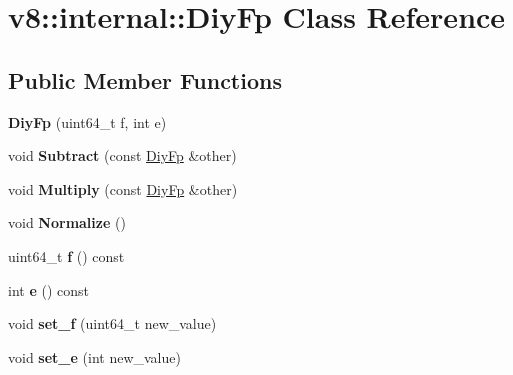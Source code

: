 \hypertarget{classv8_1_1internal_1_1_diy_fp}{}\section{v8\+:\+:internal\+:\+:Diy\+Fp Class Reference}
\label{classv8_1_1internal_1_1_diy_fp}
\subsection*{Public Member Functions}
\begin{DoxyCompactItemize}
\item 
\hypertarget{classv8_1_1internal_1_1_diy_fp_a706c119a6d9aa35dcf0781f2e2a283a0}{}{\bfseries Diy\+Fp} (uint64\+\_\+t f, int e)\label{classv8_1_1internal_1_1_diy_fp_a706c119a6d9aa35dcf0781f2e2a283a0}

\item 
\hypertarget{classv8_1_1internal_1_1_diy_fp_ad59641acca06e61296ab5b9436bcbe85}{}void {\bfseries Subtract} (const \hyperlink{classv8_1_1internal_1_1_diy_fp}{Diy\+Fp} \&other)\label{classv8_1_1internal_1_1_diy_fp_ad59641acca06e61296ab5b9436bcbe85}

\item 
\hypertarget{classv8_1_1internal_1_1_diy_fp_a50c7369cc4e9d7e9c3add0f7a4818645}{}void {\bfseries Multiply} (const \hyperlink{classv8_1_1internal_1_1_diy_fp}{Diy\+Fp} \&other)\label{classv8_1_1internal_1_1_diy_fp_a50c7369cc4e9d7e9c3add0f7a4818645}

\item 
\hypertarget{classv8_1_1internal_1_1_diy_fp_a39ba5a89a07fe9feaa4de5695da55310}{}void {\bfseries Normalize} ()\label{classv8_1_1internal_1_1_diy_fp_a39ba5a89a07fe9feaa4de5695da55310}

\item 
\hypertarget{classv8_1_1internal_1_1_diy_fp_aa67842c9f9223032303d8088436027bd}{}uint64\+\_\+t {\bfseries f} () const \label{classv8_1_1internal_1_1_diy_fp_aa67842c9f9223032303d8088436027bd}

\item 
\hypertarget{classv8_1_1internal_1_1_diy_fp_a8812342f7d608411992e55fd6f51c84e}{}int {\bfseries e} () const \label{classv8_1_1internal_1_1_diy_fp_a8812342f7d608411992e55fd6f51c84e}

\item 
\hypertarget{classv8_1_1internal_1_1_diy_fp_a95098aea05a2339189be1547512423e1}{}void {\bfseries set\+\_\+f} (uint64\+\_\+t new\+\_\+value)\label{classv8_1_1internal_1_1_diy_fp_a95098aea05a2339189be1547512423e1}

\item 
\hypertarget{classv8_1_1internal_1_1_diy_fp_a64c435e55ebd3bfd48b1a5b00d9be055}{}void {\bfseries set\+\_\+e} (int new\+\_\+value)\label{classv8_1_1internal_1_1_diy_fp_a64c435e55ebd3bfd48b1a5b00d9be055}

\end{DoxyCompactItemize}
